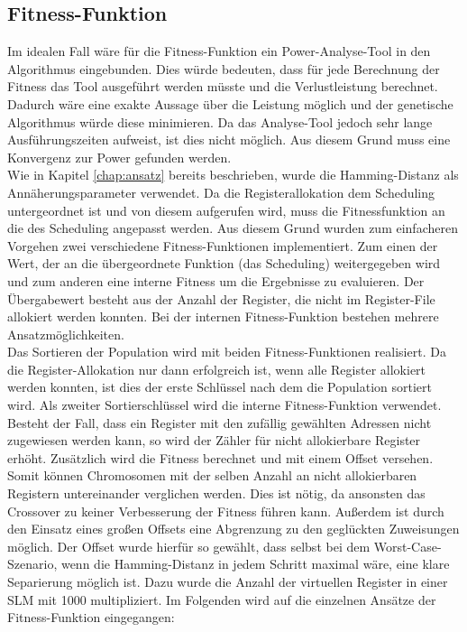 \subsection{Fitness-Funktion}
\label{chap:Fitness-Funktion}
Im idealen Fall wäre für die Fitness-Funktion ein Power-Analyse-Tool in den Algorithmus eingebunden. Dies würde bedeuten, dass für jede Berechnung der Fitness das Tool ausgeführt werden müsste und die Verlustleistung berechnet. Dadurch wäre eine exakte Aussage über die Leistung möglich und der genetische Algorithmus würde diese minimieren. Da das Analyse-Tool jedoch sehr lange Ausführungszeiten aufweist, ist dies nicht möglich. Aus diesem Grund muss eine Konvergenz zur Power gefunden werden.\\
Wie in Kapitel \ref{chap:ansatz} bereits beschrieben, wurde die Hamming-Distanz als Annäherungsparameter verwendet. Da die Registerallokation dem Scheduling untergeordnet ist und von diesem aufgerufen wird, muss die Fitnessfunktion an die des Scheduling angepasst werden. Aus diesem Grund wurden zum einfacheren Vorgehen zwei verschiedene Fitness-Funktionen implementiert. Zum einen der Wert, der an die übergeordnete Funktion (das Scheduling) weitergegeben wird und zum anderen eine interne Fitness um die Ergebnisse zu evaluieren.
Der Übergabewert besteht aus der Anzahl der Register, die nicht im Register-File allokiert werden konnten. Bei der internen Fitness-Funktion bestehen mehrere Ansatzmöglichkeiten.\\
Das Sortieren der Population wird mit beiden Fitness-Funktionen realisiert. Da die Register-Allokation nur dann erfolgreich ist, wenn alle Register allokiert werden konnten, ist dies der erste Schlüssel nach dem die Population sortiert wird. Als zweiter Sortierschlüssel wird die interne Fitness-Funktion verwendet.
Besteht der Fall, dass ein Register mit den zufällig gewählten Adressen nicht zugewiesen werden kann, so wird der Zähler für nicht allokierbare Register erhöht. Zusätzlich wird die Fitness berechnet und mit einem Offset versehen. Somit können Chromosomen mit der selben Anzahl an nicht allokierbaren Registern untereinander verglichen werden. Dies ist nötig, da ansonsten das Crossover zu keiner Verbesserung der Fitness führen kann. Außerdem ist durch den Einsatz eines großen Offsets eine Abgrenzung zu den geglückten Zuweisungen möglich. Der Offset wurde hierfür  so gewählt, dass selbst bei dem Worst-Case-Szenario, wenn die Hamming-Distanz in jedem Schritt maximal wäre, eine klare Separierung möglich ist. Dazu wurde die Anzahl der virtuellen Register in einer SLM mit 1000 multipliziert.
Im Folgenden wird auf die einzelnen Ansätze der Fitness-Funktion eingegangen:

